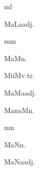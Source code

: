 \begin{multicols*}{2}
\begin{dictroot}{m}{l}
    \begin{dictentry}{MaLa}{adj.}
    \end{dictentry}
\end{dictroot}

\begin{dictroot}{m}{m}
    \begin{dictentry}{MaM}{n.}
    \end{dictentry}
    \begin{dictentry}{MiiM}{v.tr.}
    \end{dictentry}
    \begin{dictentry}{MaMa}{adj.}
    \end{dictentry}
    \begin{dictentry}{ManaM}{n.}
    \end{dictentry}
\end{dictroot}

\begin{dictroot}{m}{n}
    \begin{dictentry}{MaN}{n.}
    \end{dictentry}
    \begin{dictentry}{MaNa}{adj.}
    \end{dictentry}
\end{dictroot}


\end{multicols*}
